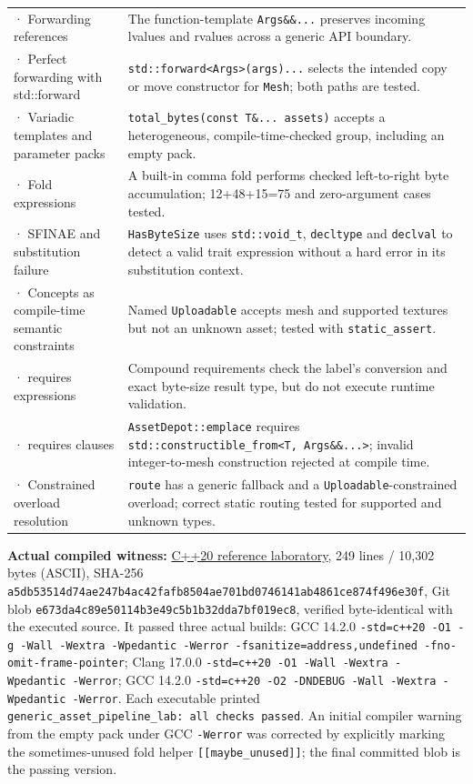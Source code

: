 {\begin{longtable}[]{@{}
  >{\raggedright\arraybackslash}p{}
  >{\raggedright\arraybackslash}p{}@{}}
208 · Forwarding references & The function-template \texttt{Args\&\&...} preserves incoming lvalues and rvalues across a generic API boundary. \\
209 · Perfect forwarding with std::forward & \texttt{std::forward\textless{}Args\textgreater{}(args)...} selects the intended copy or move constructor for \texttt{Mesh}; both paths are tested. \\
210 · Variadic templates and parameter packs & \texttt{total\_bytes(const\ T\&...\ assets)} accepts a heterogeneous, compile-time-checked group, including an empty pack. \\
211 · Fold expressions & A built-in comma fold performs checked left-to-right byte accumulation; 12+48+15=75 and zero-argument cases tested. \\
212 · SFINAE and substitution failure & \texttt{HasByteSize} uses \texttt{std::void\_t}, \texttt{decltype} and \texttt{declval} to detect a valid trait expression without a hard error in its substitution context. \\
213 · Concepts as compile-time semantic constraints & Named \texttt{Uploadable} accepts mesh and supported textures but not an unknown asset; tested with \texttt{static\_assert}. \\
214 · requires expressions & Compound requirements check the label's conversion and exact byte-size result type, but do not execute runtime validation. \\
215 · requires clauses & \texttt{AssetDepot::emplace} requires \texttt{std::constructible\_from\textless{}T,\ Args\&\&...\textgreater{}}; invalid integer-to-mesh construction rejected at compile time. \\
216 · Constrained overload resolution & \texttt{route} has a generic fallback and a \texttt{Uploadable}-constrained overload; correct static routing tested for supported and unknown types. \\
\end{longtable}
}

\textbf{Actual compiled witness:} \hyperref[source-file-a5db53514d74ae247b4ac42f]{C++20 reference laboratory}, 249 lines / 10,302 bytes (ASCII), SHA-256 \texttt{a5db53514d74ae247b4ac42fafb8504ae701bd0746141ab4861ce874f496e30f}, Git blob \texttt{e673da4c89e50114b3e49c5b1b32dda7bf019ec8}, verified byte-identical with the executed source. It passed three actual builds: GCC 14.2.0 \texttt{-std=c++20\ -O1\ -g\ -Wall\ -Wextra\ -Wpedantic\ -Werror\ -fsanitize=address,undefined\ -fno-omit-frame-pointer}; Clang 17.0.0 \texttt{-std=c++20\ -O1\ -Wall\ -Wextra\ -Wpedantic\ -Werror}; GCC 14.2.0 \texttt{-std=c++20\ -O2\ -DNDEBUG\ -Wall\ -Wextra\ -Wpedantic\ -Werror}. Each executable printed \texttt{generic\_asset\_pipeline\_lab:\ all\ checks\ passed}. An initial compiler warning from the empty pack under GCC \texttt{-Werror} was corrected by explicitly marking the sometimes-unused fold helper \texttt{{[}{[}maybe\_unused{]}{]}}; the final committed blob is the passing version.

